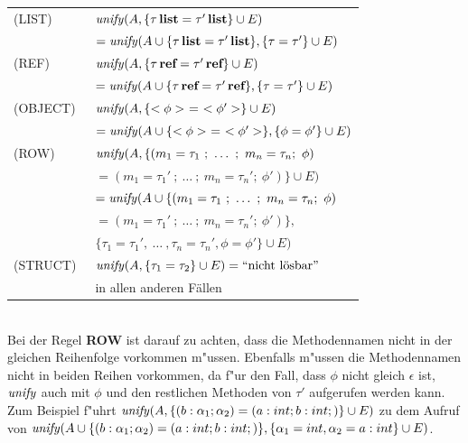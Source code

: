 \begin{tabular}{ll}
  (LIST)\     & ${\text{\it unify\/}}(A,\{\tau\,\textbf{list} = \tau'\,\textbf{list} \} \cup E)$\\[1mm]
              & \quad $= {\text{\it unify\/}}(A \cup \{\tau\,\textbf{list} = \tau'\,\textbf{list} \},
                         \{\tau = \tau' \} \cup E)$\\[3mm]
  (REF)\      & ${\text{\it unify\/}}(A,\{\tau\,\textbf{ref} = \tau'\,\textbf{ref} \} \cup E)$\\[1mm]
              & \quad $= {\text{\it unify\/}}(A \cup \{\tau\,\textbf{ref} = \tau'\,\textbf{ref} \},
                         \{\tau = \tau' \} \cup E)$\\[3mm]
  (OBJECT)\   & ${\text{\it unify\/}}(A,\{<\phi>\ =\ <\phi'> \} \cup E)$\\[1mm]
              & \quad $= {\text{\it unify\/}}(A \cup \{<\phi>\ =\ <\phi'> \},
                         \{\phi = \phi' \} \cup E)$\\[3mm]
  (ROW)\      & ${\text{\it unify\/}}(A,\{ (m_1 = \tau_1\ ;\ \ldots\ ;\ m_n = \tau_n;\ \phi)$\\
              & \quad $= (m_1 = \tau_1'\ ;\ \ldots\ ;\ m_n = \tau_n';\ \phi') \} \cup E)$\\[1mm]
              & \quad $= {\text{\it unify\/}}(A \cup \{ (m_1 = \tau_1\ ;\ \ldots\ ;\ m_n = \tau_n;\ \phi)$\\
              & \quad \quad $= (m_1 = \tau_1'\ ;\ \ldots\ ;\ m_n = \tau_n';\ \phi') \},$\\
              & \quad \quad \quad $\{\tau_1 = \tau_1', \ \ldots\ ,\tau_n = \tau_n',
                \phi = \phi' \} \cup E)$\\[3mm]
  (STRUCT)\   & ${\text{\it unify\/}}(A,\{\tau_1 = \tau_2\} \cup E) = \mbox{``nicht l\"osbar''}$\\[1mm]
              & in  allen anderen F\"allen
\end{tabular}\\[6mm]
Bei der Regel {\bf ROW} ist darauf zu achten, dass die Methodennamen nicht in der gleichen Reihenfolge
vorkommen m"ussen. Ebenfalls m"ussen die Methodennamen nicht in beiden Reihen vorkommen, da f"ur den Fall, 
dass $\phi$ nicht gleich $\epsilon$ ist, ${\text{\it unify\/}}$ auch mit $\phi$ und den restlichen Methoden von $\tau'$ 
aufgerufen werden kann. Zum Beispiel f"uhrt ${\text{\it unify\/}} (A,\{ (b: \alpha_1 ; \alpha_2) = (a: int ; b: int ;)\}
\cup E)$ zu dem Aufruf von ${\text{\it unify\/}} (A \cup \{ (b: \alpha_1 ; \alpha_2) = (a: int ; b: int ;)\},
\{\alpha_1 = int, \alpha_2 = a: int\} \cup E)$.


